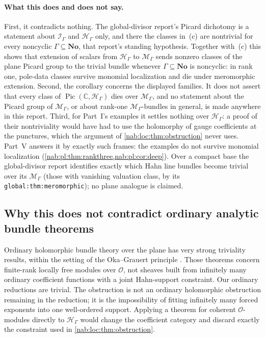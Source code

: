 \documentclass[11pt,letterpaper]{article}
\theoremstyle{definition}
\theoremstyle{remark}
\newcommand{\C}{\mathbb C}
\newcommand{\No}{\mathbf{No}}
\newcommand{\OO}{\mathcal O}
\newcommand{\HH}{\mathscr H_\Gamma}
\newcommand{\II}{\mathscr I_\Gamma}
\newcommand{\MM}{\mathscr M_\Gamma}
\newcommand{\Pic}{\operatorname{Pic}}
\numberwithin{equation}{section}
\begin{document}
\paragraph{What this does and does not say.}
First, it contradicts nothing. The global-divisor report's Picard dichotomy is
a statement about $\II$ and $\HH$ only, and there the classes in~(c) are
nontrivial for every noncyclic $\Gamma\subseteq\No$, that report's standing
hypothesis. Together with~(c) this shows that extension of scalars from $\HH$
to $\MM$ sends nonzero classes of the plane Picard group to the trivial bundle
whenever $\Gamma\subseteq\No$ is noncyclic: in rank one, pole-data classes survive monomial localization
and die under meromorphic extension. Second, the corollary concerns the
displayed families. It does not assert that every class of $\Pic(\C,\HH)$ dies
over $\MM$, and no statement about the Picard group of $\MM$, or about rank-one
$\MM$-bundles in general, is made anywhere in this report. Third, for Part~I's
examples it settles nothing over $\HH$: a proof of their nontriviality would
have had to use the holomorphy of gauge coefficients at the punctures, which the
argument of \cref{nab:loc:thm:obstruction} never uses. Part~V answers
it by exactly such frames: the examples do not survive monomial localization
(\cref{nab:pl:thm:rankthree,nab:pl:cor:deep}). Over a compact base the
global-divisor report identifies exactly which Hahn line bundles become trivial
over its $\mathscr M_\Gamma$ (those with vanishing valuation class, by its
\texttt{global:thm:meromorphic}); no plane analogue is claimed.

\subsection{Why this does not contradict ordinary analytic bundle theorems}

Ordinary holomorphic bundle theory over the plane has very strong triviality
results, within the setting of the Oka--Grauert principle \cite{Grauert}. Those
theorems concern finite-rank locally free modules over $\OO$, not sheaves built
from infinitely many ordinary coefficient functions with a joint Hahn-support
constraint. Our ordinary reductions are trivial. The obstruction is not an
ordinary holomorphic obstruction remaining in the reduction; it is the
impossibility of fitting infinitely many forced exponents into one well-ordered
support. Applying a theorem for coherent $\OO$-modules directly to $\HH$ would
change the coefficient category and discard exactly the constraint used in
\cref{nab:loc:thm:obstruction}.
\end{document}
